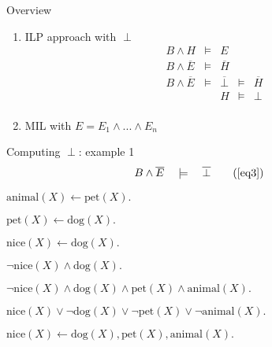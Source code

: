 \begin{frame}{Overview}

\begin{enumerate}
    \item ILP approach with $\perp$ 
$$\begin{matrix}
            B \land H &\models& E && \\
            B \land \overline{E} &\models& \overline{H} && \\
            B \land \overline{E} &\models& \overline{\perp} &\models& \overline{H}\\
            && H &\models& \perp \\
\end{matrix}$$
    \item MIL with $E = E_1 \land ... \land E_n$
\end{enumerate}
    
\end{frame}


\begin{frame}{Computing $\perp$: example 1}
\vfill
\begin{align}
B \land \overline{E} \quad &\models \quad \overline{\perp} \tag{\ref{eq3}}
\end{align}
\vfill
\begin{description}
\item[$B$] $\text{animal}(X) \leftarrow \text{pet}(X).$
\item[]    $\text{pet}(X) \leftarrow \text{dog}(X).$
\item[$E$] $\text{nice}(X) \leftarrow \text{dog}(X).$
\item<2->[$\overline{E}$] $ \neg \text{nice}(X) \land \text{dog}(X).$
\item<3->[$\overline{\perp}$] $ \neg \text{nice}(X) \land \text{dog}(X) \land \text{pet}(X) \land \text{animal}(X).$
\item<4->[$\perp$] $\text{nice}(X) \lor \neg \text{dog}(X) \lor \neg \text{pet}(X) \lor \neg \text{animal}(X).$
\item<5->[] $\text{nice}(X) \leftarrow \text{dog}(X), \text{pet}(X), \text{animal}(X).$
\end{description}
\vfill
\end{frame}

